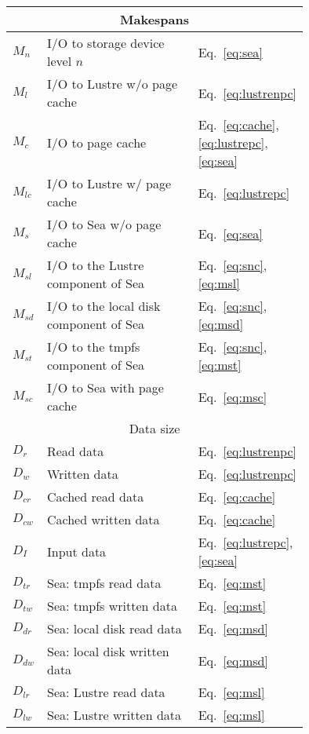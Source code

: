       \begin{table}
      \centering
      \begin{tabular}{|p{0.05\linewidth}|p{0.6\linewidth}|p{0.1\linewidth}|}
       \hline
       \multicolumn{3}{|c|}{Makespans} \\
       \hline
       $M_{n}$ & I/O to storage device level $n$ & Eq.~\ref{eq:sea}\\
       $M_{l}$ & I/O to Lustre w/o page cache & Eq.~\ref{eq:lustrenpc}\\
       $M_{c}$ & I/O to page cache & Eq.~\ref{eq:cache}, \ref{eq:lustrepc}, \ref{eq:sea}\\
       $M_{lc}$ & I/O to Lustre w/ page cache & Eq.~\ref{eq:lustrepc}\\
       $M_{s}$ &  I/O to Sea w/o page cache & Eq.~\ref{eq:sea}\\
       $M_{sl}$ & I/O to the Lustre component of Sea & Eq.~\ref{eq:snc}, \ref{eq:msl} \\
       $M_{sd}$ & I/O to the local disk component of Sea & Eq.~\ref{eq:snc}, \ref{eq:msd} \\
       $M_{st}$ & I/O to the tmpfs component of Sea & Eq.~\ref{eq:snc}, \ref{eq:mst} \\
       $M_{sc}$ & I/O to Sea with page cache & Eq.~\ref{eq:msc} \\
       \hline
       \multicolumn{3}{|c|}{Data size} \\
       \hline
       $D_{r}$ & Read data & Eq.~\ref{eq:lustrenpc}\\
       $D_{w}$ & Written data & Eq.~\ref{eq:lustrenpc}\\
       $D_{cr}$ & Cached read data & Eq.~\ref{eq:cache}\\
       $D_{cw}$ & Cached written data & Eq.~\ref{eq:cache}\\
       $D_{I}$ & Input data & Eq.~\ref{eq:lustrepc}, \ref{eq:sea}\\
       $D_{tr}$ & Sea: tmpfs read data & Eq.~\ref{eq:mst} \\
       $D_{tw}$ & Sea: tmpfs written data & Eq.~\ref{eq:mst} \\
       $D_{dr}$ & Sea: local disk read data & Eq.~\ref{eq:msd} \\
       $D_{dw}$ & Sea: local disk written data & Eq.~\ref{eq:msd} \\
       $D_{lr}$ & Sea: Lustre read data & Eq.~\ref{eq:msl} \\
       $D_{lw}$ & Sea: Lustre written data & Eq.~\ref{eq:msl} \\

\end{tabular}
\end{table}
